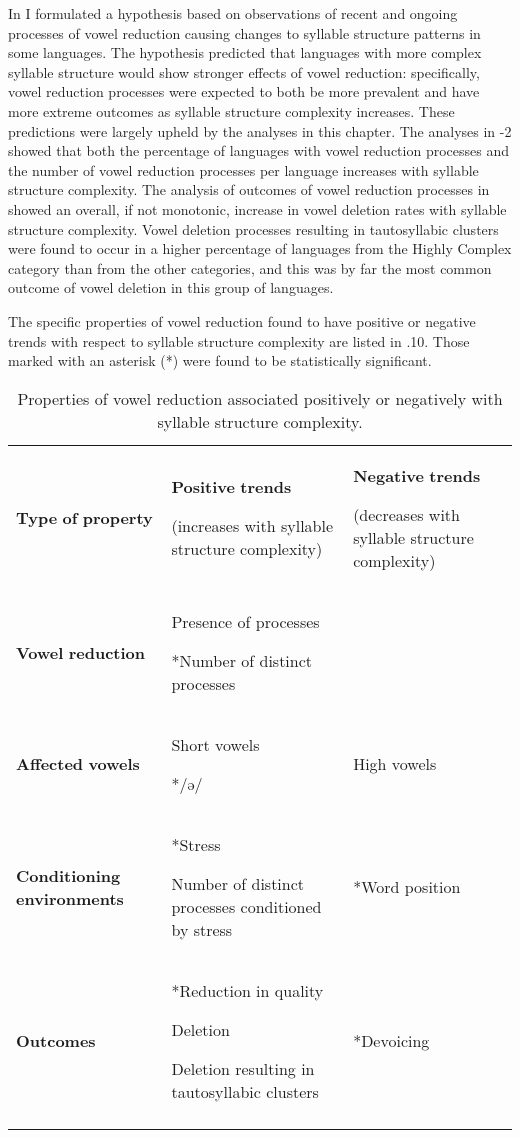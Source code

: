   In  I formulated a hypothesis based on observations of recent and ongoing processes of vowel reduction causing changes to syllable structure patterns in some languages. The hypothesis predicted that languages with more complex syllable structure would show stronger effects of vowel reduction: specifically, vowel reduction processes were expected to both be more prevalent and have more extreme outcomes as syllable structure complexity increases. These predictions were largely upheld by the analyses in this chapter. The analyses in -2 showed that both the percentage of languages with vowel reduction processes and the number of vowel reduction processes per language increases with syllable structure complexity. The analysis of outcomes of vowel reduction processes in  showed an overall, if not monotonic, increase in vowel deletion rates with syllable structure complexity. Vowel deletion processes resulting in tautosyllabic clusters were found to occur in a higher percentage of languages from the Highly Complex category than from the other categories, and this was by far the most common outcome of vowel deletion in this group of languages.

  The specific properties of vowel reduction found to have positive or negative trends with respect to syllable structure complexity are listed in .10. Those marked with an asterisk (*) were found to be statistically significant.

\begin{table}
\begin{tabularx}{\textwidth}{XXX}
\lsptoprule

\textbf{Type} \textbf{of} \textbf{property} & \textbf{Positive} \textbf{trends}

(increases with syllable structure complexity) & \textbf{Negative} \textbf{trends}

(decreases with syllable structure complexity)\\
\textbf{Vowel} \textbf{reduction} & Presence of processes

*Number of distinct processes & \\
\textbf{Affected} \textbf{vowels} & Short vowels

*/ə/ & High vowels\\
\textbf{Conditioning} \textbf{environments} & *Stress

Number of distinct processes conditioned by stress & *Word position\\
\textbf{Outcomes} & *Reduction in quality

Deletion

Deletion resulting in tautosyllabic clusters & *Devoicing\\
\lspbottomrule
\end{tabularx}
\caption{\label{6.10}Properties of vowel reduction associated positively or negatively with syllable structure complexity.}
\end{table}

